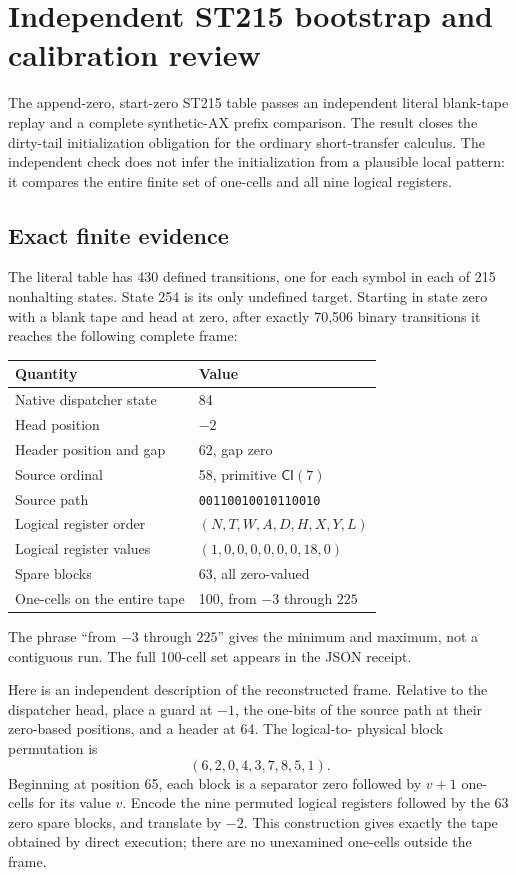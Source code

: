 \section{Independent ST215 bootstrap and calibration review}
\label{sec:st215-independent-review}

The append-zero, start-zero ST215 table passes an independent literal
blank-tape replay and a complete synthetic-AX prefix comparison.  The
result closes the dirty-tail initialization obligation for the ordinary
short-transfer calculus.  The independent check does not infer the
initialization from a plausible local pattern: it compares the entire
finite set of one-cells and all nine logical registers.

\subsection{Exact finite evidence}

The literal table has 430 defined transitions, one for each symbol in
each of 215 nonhalting states.  State 254 is its only undefined target.
Starting in state zero with a blank tape and head at zero, after exactly
70,506 binary transitions it reaches the following complete frame:
\begin{center}
\begin{tabular}{ll}
\toprule
Quantity & Value\\
\midrule
Native dispatcher state & 84\\
Head position & $-2$\\
Header position and gap & $62$, gap zero\\
Source ordinal & 58, primitive $\mathsf{CI}(7)$\\
Source path & \texttt{00110010010110010}\\
Logical register order & $(N,T,W,A,D,H,X,Y,L)$\\
Logical register values & $(1,0,0,0,0,0,0,18,0)$\\
Spare blocks & 63, all zero-valued\\
One-cells on the entire tape & 100, from $-3$ through $225$\\
\bottomrule
\end{tabular}
\end{center}
The phrase ``from $-3$ through $225$'' gives the minimum and maximum,
not a contiguous run.  The full 100-cell set appears in the JSON receipt.

Here is an independent description of the reconstructed frame.  Relative
to the dispatcher head, place a guard at $-1$, the one-bits of the source
path at their zero-based positions, and a header at 64.  The logical-to-
physical block permutation is
\[
                         (6,2,0,4,3,7,8,5,1).
\]
Beginning at position 65, each block is a separator zero followed by
$v+1$ one-cells for its value $v$.  Encode the nine permuted logical
registers followed by the 63 zero spare blocks, and translate by $-2$.
This construction gives exactly the tape obtained by direct execution;
there are no unexamined one-cells outside the frame.

